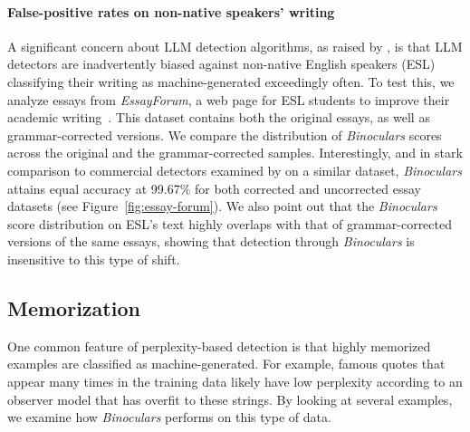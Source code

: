 \documentclass{article} %
\begin{document}

\paragraph{False-positive rates on non-native speakers' writing} 
A significant concern about LLM detection algorithms, as raised by \citet{liang_gpt_2023}, is that LLM detectors are inadvertently biased against non-native English speakers (ESL) classifying their writing as machine-generated exceedingly often.
To test this, we analyze essays from \textit{EssayForum}, a web page for ESL students to improve their academic writing~\citep{essayforum_nid989essayfroum-dataset_2022}.
This dataset contains both the original essays, as well as grammar-corrected versions.
We compare the distribution of \emph{Binoculars} scores across the original and the grammar-corrected samples.
Interestingly, and in stark comparison to commercial detectors examined by \citet{liang_gpt_2023} on a similar dataset, \emph{Binoculars} attains equal accuracy at 99.67\% for both corrected and uncorrected essay datasets (see Figure~\ref{fig:essay-forum}). 
We also point out that the \emph{Binoculars} score distribution on ESL's text highly overlaps with that of grammar-corrected versions of the same essays, showing that detection through \textit{Binoculars} is insensitive to this type of shift. %

\subsection{Memorization}
\label{sec:memorized-strings}

One common feature of perplexity-based detection is that highly memorized examples are classified as machine-generated.
For example, famous quotes that appear many times in the training data likely have low perplexity according to an observer model that has overfit to these strings. 
By looking at several examples, we examine how \emph{Binoculars} performs on this type of data.
\end{document}
